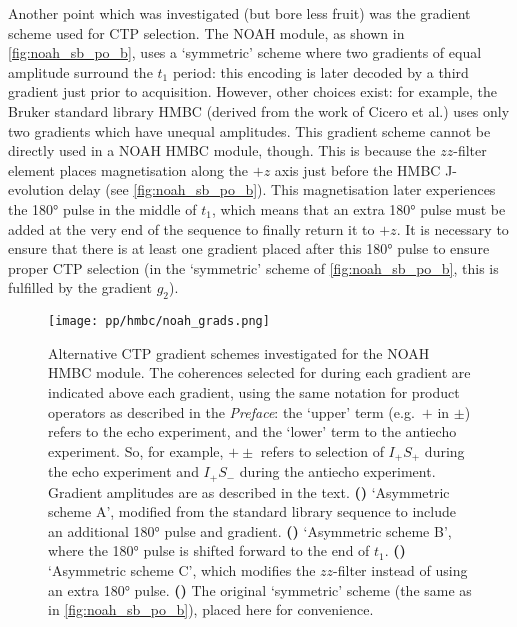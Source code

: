 Another point which was investigated (but bore less fruit) was the gradient scheme used for CTP selection.
The NOAH module, as shown in \cref{fig:noah_sb_po_b}, uses a `symmetric' scheme where two gradients of equal amplitude surround the $t_1$ period: this encoding is later decoded by a third gradient just prior to acquisition.
However, other choices exist: for example, the Bruker standard library HMBC (derived from the work of Cicero et al.\autocite{Cicero2001JMR}) uses only two gradients which have unequal amplitudes.
This gradient scheme cannot be directly used in a NOAH HMBC module, though.
This is because the $zz$-filter element places  magnetisation along the $+z$ axis just before the HMBC J-evolution delay (see \cref{fig:noah_sb_po_b}).
This magnetisation later experiences the \proton{} \ang{180} pulse in the middle of $t_1$, which means that an extra \ang{180} pulse must be added at the very end of the sequence to finally return it to $+z$.
It is necessary to ensure that there is at least one gradient placed after this \ang{180} pulse to ensure proper CTP selection (in the `symmetric' scheme of \cref{fig:noah_sb_po_b}, this is fulfilled by the gradient $g_2$).

\begin{figure}[!htbp]
    \centering
    \texttt{[image: pp/hmbc/noah\_grads.png]}%
    {\label{fig:noah_hmbc_grads_bga}}%
    {\label{fig:noah_hmbc_grads_bgb}}%
    {\label{fig:noah_hmbc_grads_bgc}}%
    {\label{fig:noah_hmbc_grads_b}}%
    \caption[Alternative CTP gradient schemes investigated for NOAH HMBC]{
        Alternative CTP gradient schemes investigated for the NOAH HMBC module.
        The coherences selected for during each gradient are indicated above each gradient, using the same notation for product operators as described in the \textit{Preface}: the `upper' term (e.g.\ $+$ in $\pm$) refers to the echo experiment, and the `lower' term to the antiecho experiment.
        So, for example, $+\pm$ refers to selection of $I_+S_+$ during the echo experiment and $I_+S_-$ during the antiecho experiment.
        Gradient amplitudes are as described in the text.
        \textbf{()} `Asymmetric scheme A', modified from the standard library sequence to include an additional \ang{180} pulse and gradient.
        \textbf{()} `Asymmetric scheme B', where the \ang{180} pulse is shifted forward to the end of $t_1$.
        \textbf{()} `Asymmetric scheme C', which modifies the $zz$-filter instead of using an extra \ang{180} pulse.
        \textbf{()} The original `symmetric' scheme (the same as in \cref{fig:noah_sb_po_b}), placed here for convenience.
    }
    \label{fig:noah_hmbc_grads}
\end{figure}

